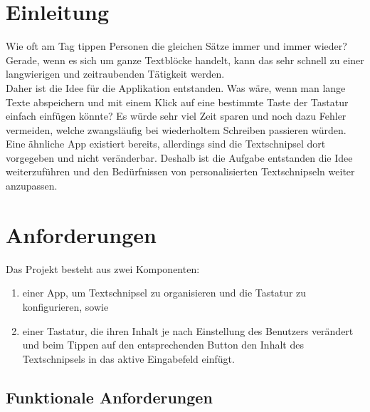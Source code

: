 \documentclass[11pt]{article}
\begin{document}
	\section{Einleitung}
	Wie oft am Tag tippen Personen die gleichen Sätze immer und immer wieder? Gerade, wenn es sich um ganze Textblöcke handelt, kann das sehr schnell zu einer langwierigen und zeitraubenden Tätigkeit werden. \\
	Daher ist die Idee für die Applikation entstanden. Was wäre, wenn man lange Texte abspeichern und mit einem Klick auf eine bestimmte Taste der Tastatur einfach einfügen könnte? Es würde sehr viel Zeit sparen und noch dazu Fehler vermeiden, welche zwangsläufig bei wiederholtem Schreiben passieren würden. \\
	Eine ähnliche App existiert bereits, allerdings sind die Textschnipsel dort vorgegeben und nicht veränderbar. Deshalb ist die Aufgabe entstanden die Idee weiterzuführen und den Bedürfnissen von personalisierten Textschnipseln weiter anzupassen.
	
	\section{Anforderungen}
	Das Projekt besteht aus zwei Komponenten:
	\begin{enumerate}
		\item einer App, um Textschnipsel zu organisieren und die Tastatur zu konfigurieren, sowie
		\item einer Tastatur, die ihren Inhalt je nach Einstellung des Benutzers verändert und beim Tippen auf den entsprechenden Button den Inhalt des Textschnipsels in das aktive Eingabefeld einfügt.
	\end{enumerate}
	\subsection{Funktionale Anforderungen}
\end{document}
